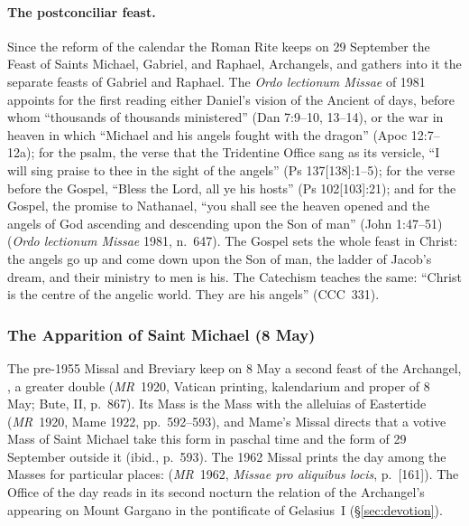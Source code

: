 \paragraph{The postconciliar feast.} Since the reform of the calendar the
Roman Rite keeps on 29 September the Feast of Saints Michael, Gabriel,
and Raphael, Archangels, and gathers into it the separate feasts of
Gabriel and Raphael. The \emph{Ordo lectionum Missae} of 1981 appoints for
the first reading either Daniel's vision of the Ancient of days, before
whom ``thousands of thousands ministered'' (Dan 7:9--10, 13--14), or the
war in heaven in which ``Michael and his angels fought with the dragon''
(Apoc 12:7--12a); for the psalm, the verse that the Tridentine Office sang
as its versicle, ``I will sing praise to thee in the sight of the
angels'' (Ps 137[138]:1--5); for the verse before the Gospel, ``Bless the
Lord, all ye his hosts'' (Ps 102[103]:21); and for the Gospel, the promise
to Nathanael, ``you shall see the heaven opened and the angels of God
ascending and descending upon the Son of man'' (John 1:47--51)
(\emph{Ordo lectionum Missae} 1981, n.~647). The Gospel sets the whole
feast in Christ: the angels go up and come down upon the Son of man, the
ladder of Jacob's dream, and their ministry to men is his. The
Catechism teaches the same: ``Christ is the centre of the
angelic world. They are his angels'' (CCC~331).

\subsubsection{The Apparition of Saint Michael (8 May)}

The pre-1955 Missal and Breviary keep on 8 May a second feast of the
Archangel, , a greater
double (\emph{MR}~1920, Vatican printing, kalendarium and proper of 8 May;
Bute, II, p.~867). Its Mass
is the Mass  with the alleluias of Eastertide
(\emph{MR}~1920, Mame 1922, pp.~592--593), and Mame's Missal directs that
a votive Mass of Saint Michael take this form in paschal time and the form
of 29 September outside it (ibid., p.~593). The 1962 Missal prints the
day among the Masses for particular places:  (\emph{MR}~1962, \emph{Missae pro aliquibus locis},
p.~[161]). The Office of the day reads in its second nocturn the relation
of the Archangel's appearing on Mount Gargano in the pontificate of
Gelasius~I (\S\ref{sec:devotion}).

